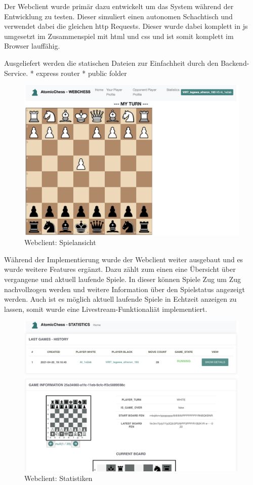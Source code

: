 Der Webclient wurde primär dazu entwickelt um das System während der
Entwicklung zu testen. Dieser simuliert einen autonomen Schachtisch und
verwendet dabei die gleichen \gls{http} Requests. Dieser wurde dabei
komplett in \gls{js} umgesetzt im Zusammenspiel mit \gls{html} und
\gls{css} und ist somit komplett im Browser lauffähig.

Ausgeliefert werden die statischen Dateien zur Einfachheit durch den
Backend-Service. * express router * public folder

\begin{figure}
\centering
\includegraphics{images/ATC_webclient.png}
\caption{Webclient: Spielansicht}
\end{figure}

Während der Implementierung wurde der Webclient weiter ausgebaut und es
wurde weitere Features ergänzt. Dazu zählt zum einen eine Übersicht über
vergangene und aktuell laufende Spiele. In dieser können Spiele Zug um
Zug nachvollzogen werden und weitere Information über den Spielstatus
angezeigt werden. Auch ist es möglich aktuell laufende Spiele in
Echtzeit anzeigen zu lassen, somit wurde eine Livestream-Funktionaliät
implementiert.

\begin{figure}
\centering
\includegraphics{images/ATC_statistics.png}
\caption{Webclient: Statistiken}
\end{figure}

